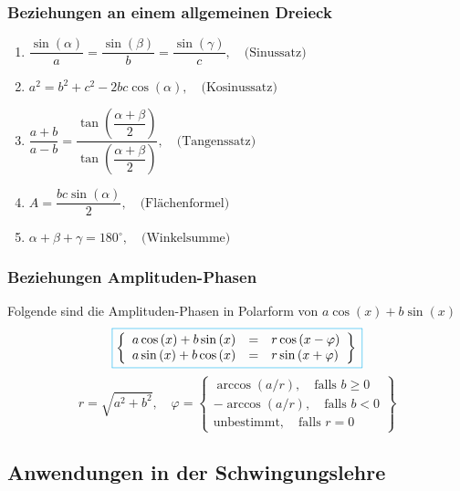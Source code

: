 \subsubsection{Beziehungen an einem allgemeinen Dreieck}
\begin{enumerate}[$(i)$]
\item $\dfrac{\sin\left(\alpha\right)}{a}=\dfrac{\sin\left(\beta\right)}{b}=\dfrac{\sin\left(\gamma\right)}{c},\quad \text{(Sinussatz)}$
\item $a^2=b^2+c^2-2bc\cos\left(\alpha\right),\quad \text{(Kosinussatz)}$
\item $\dfrac{a+b}{a-b}=\dfrac{\tan\left(\dfrac{\alpha+\beta}{2}\right)}{\tan\left(\dfrac{\alpha+\beta}{2}\right)},\quad \text{(Tangenssatz)}$
\item $A=\dfrac{bc\sin\left(\alpha\right)}{2},\quad \text{(Flächenformel)}$
\item $\alpha+\beta+\gamma = 180^{\circ},\quad \text{(Winkelsumme)}$
\end{enumerate}
\subsubsection{Beziehungen Amplituden-Phasen}
Folgende sind die Amplituden-Phasen in Polarform von $a\cos\left(x\right)+b\sin\left(x\right)$
\begin{equation}
\boxed{
\left\{\begin{array}{lll}
a\cos\left(x\right)+b\sin\left(x\right)&=&r\cos\left(x-\varphi\right)\\
a\sin\left(x\right)+b\cos\left(x\right)&=&r\sin\left(x+\varphi\right)\\
\end{array}\right\}\\
}
\end{equation}
\begin{equation}
\boxed{r=\sqrt{a^2+b^2},\quad \varphi=\left\{\begin{array}{lll}\arccos\left(a/r\right),\quad \text{falls }b\geq 0\\-\arccos\left(a/r\right),\quad \text{falls }b<0\\\text{unbestimmt},\quad \text{falls }r=0\end{array}\right\}}
\end{equation}
\subsection{Anwendungen in der Schwingungslehre}
